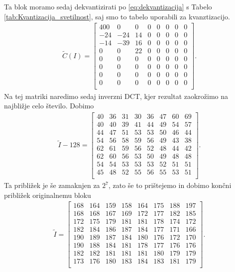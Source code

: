 \documentclass[a4paper,12pt,openright]{book}
\begin{document}
Ta blok moramo sedaj dekvantizirati po \eqref{eq:dekvantizacija} s Tabelo \ref{tab:Kvantizacija_svetilnost}, saj smo to tabelo uporabili za kvanztizacijo.
\begin{gather*}
 \widetilde{C}(I) =
  \begin{bmatrix}
400&   0&   0&   0&   0&   0&   0&   0\\
-24& -24&  14&   0&   0&   0&   0&   0\\
-14& -39&  16&   0&   0&   0&   0&   0\\
  0&   0&  22&   0&   0&   0&   0&   0\\
  0&   0&   0&   0&   0&   0&   0&   0\\
  0&   0&   0&   0&   0&   0&   0&   0\\
  0&   0&   0&   0&   0&   0&   0&   0\\
  0&   0&   0&   0&   0&   0&   0&   0\\
   \end{bmatrix}.
\end{gather*}
Na tej matriki naredimo sedaj inverzni DCT, kjer rezultat zaokrožimo na najbližje celo število. Dobimo
\begin{gather*}
 \widetilde{I}-128 =
  \begin{bmatrix}
  40& 36& 31& 30& 36& 47& 60& 69\\
  40& 40& 39& 41& 44& 49& 54& 57\\
  44& 47& 51& 53& 53& 50& 46& 44\\
  54& 56& 58& 59& 56& 49& 43& 38\\
  62& 61& 59& 56& 52& 48& 44& 42\\
  62& 60& 56& 53& 50& 49& 48& 48\\
  54& 54& 53& 53& 53& 52& 51& 51\\
  45& 48& 52& 55& 56& 55& 53& 51\\
  \end{bmatrix}.
\end{gather*}
Ta približek je še zamaknjen za $2^7$, zato še to prištejemo in dobimo končni približek originalnemu bloku
\begin{gather*}
 \widetilde{I} =
  \begin{bmatrix}
  168& 164& 159& 158& 164& 175& 188& 197\\
  168& 168& 167& 169& 172& 177& 182& 185\\
  172& 175& 179& 181& 181& 178& 174& 172\\
  182& 184& 186& 187& 184& 177& 171& 166\\
  190& 189& 187& 184& 180& 176& 172& 170\\
  190& 188& 184& 181& 178& 177& 176& 176\\
  182& 182& 181& 181& 181& 180& 179& 179\\
  173& 176& 180& 183& 184& 183& 181& 179\\
  \end{bmatrix}.
\end{gather*}
\end{document}
